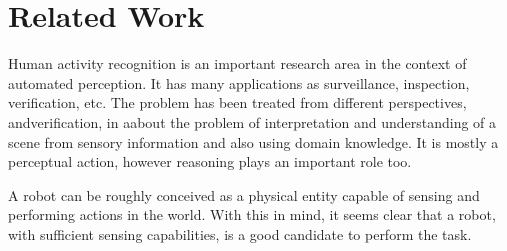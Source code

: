 \chapter{Related Work}


Human activity recognition is an important research area in the context of automated perception. It has many applications as surveillance, inspection, verification, etc. The problem has been treated from different perspectives,  andverification, in aabout the problem of interpretation and understanding of a scene from sensory information and also using domain knowledge. 
It is mostly a perceptual action, however reasoning plays an important role too.





A robot can be roughly conceived as a physical entity capable of sensing and performing actions in the world.
With this in mind, it seems clear that a robot, with sufficient sensing capabilities, is a good candidate to perform the task.




% 
